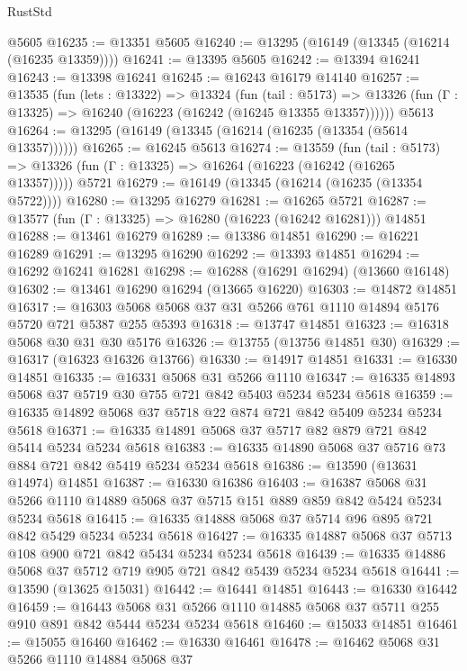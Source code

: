 \begin{lexlean}{RustStd}
\begin{coremodule}
    @5605
@16235 := @13351 @5605
@16240 := @13295 (@16149 (@13345 (@16214 (@16235 @13359))))
@16241 := @13395 @5605
@16242 := @13394 @16241
@16243 := @13398 @16241
@16245 := @16243 @16179 @14140
@16257 := @13535
    (fun (lets : @13322) =>
    @13324
      (fun (tail : @5173) =>
      @13326 (fun (Γ : @13325) => @16240 (@16223 (@16242 (@16245 @13355 @13357))))))
    @5613
@16264 := @13295 (@16149 (@13345 (@16214 (@16235 (@13354 (@5614 @13357))))))
@16265 := @16245 @5613
@16274 := @13559
    (fun (tail : @5173) => @13326 (fun (Γ : @13325) => @16264 (@16223 (@16242 (@16265 @13357)))))
    @5721
@16279 := @16149 (@13345 (@16214 (@16235 (@13354 @5722))))
@16280 := @13295 @16279
@16281 := @16265 @5721
@16287 := @13577 (fun (Γ : @13325) => @16280 (@16223 (@16242 @16281))) @14851
@16288 := @13461 @16279
@16289 := @13386 @14851
@16290 := @16221 @16289
@16291 := @13295 @16290
@16292 := @13393 @14851
@16294 := @16292 @16241 @16281
@16298 := @16288 (@16291 @16294) (@13660 @16148)
@16302 := @13461 @16290 @16294 (@13665 @16220)
@16303 := @14872 @14851
@16317 := @16303 @5068 @5068 @37 @31 @5266 @761 @1110 @14894 @5176 @5720 @721 @5387 @255 @5393
@16318 := @13747 @14851
@16323 := @16318 @5068 @30 @31 @30 @5176
@16326 := @13755 (@13756 @14851 @30)
@16329 := @16317 (@16323 @16326 @13766)
@16330 := @14917 @14851
@16331 := @16330 @14851
@16335 := @16331 @5068 @31 @5266 @1110
@16347 := @16335 @14893 @5068 @37 @5719 @30 @755 @721 @842 @5403 @5234 @5234 @5618
@16359 := @16335 @14892 @5068 @37 @5718 @22 @874 @721 @842 @5409 @5234 @5234 @5618
@16371 := @16335 @14891 @5068 @37 @5717 @82 @879 @721 @842 @5414 @5234 @5234 @5618
@16383 := @16335 @14890 @5068 @37 @5716 @73 @884 @721 @842 @5419 @5234 @5234 @5618
@16386 := @13590 (@13631 @14974) @14851
@16387 := @16330 @16386
@16403 := @16387
    @5068
    @31
    @5266
    @1110
    @14889
    @5068
    @37
    @5715
    @151
    @889
    @859
    @842
    @5424
    @5234
    @5234
    @5618
@16415 := @16335 @14888 @5068 @37 @5714 @96 @895 @721 @842 @5429 @5234 @5234 @5618
@16427 := @16335 @14887 @5068 @37 @5713 @108 @900 @721 @842 @5434 @5234 @5234 @5618
@16439 := @16335 @14886 @5068 @37 @5712 @719 @905 @721 @842 @5439 @5234 @5234 @5618
@16441 := @13590 (@13625 @15031)
@16442 := @16441 @14851
@16443 := @16330 @16442
@16459 := @16443
    @5068
    @31
    @5266
    @1110
    @14885
    @5068
    @37
    @5711
    @255
    @910
    @891
    @842
    @5444
    @5234
    @5234
    @5618
@16460 := @15033 @14851
@16461 := @15055 @16460
@16462 := @16330 @16461
@16478 := @16462
    @5068
    @31
    @5266
    @1110
    @14884
    @5068
    @37

\end{coremodule}
\end{lexlean}
